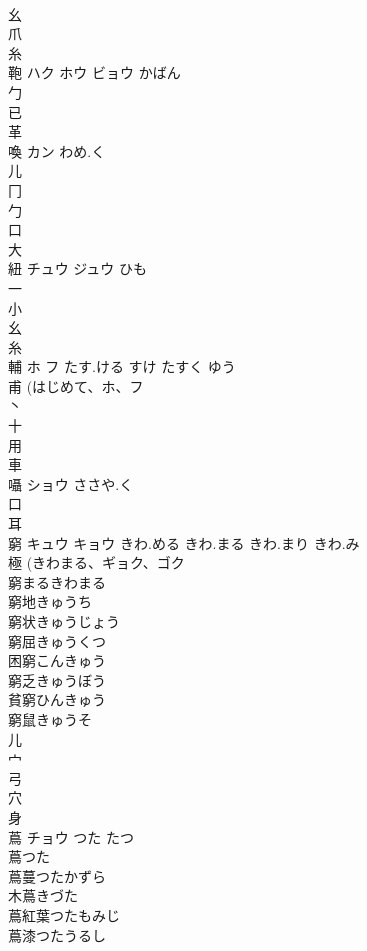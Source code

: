 \documentclass[8pt]{extreport}
\begin{document}
\begin{CJK}{UTF8}{min}
\\	幺 
\\	爪 
\\	糸 
\\	鞄	ハク ホウ ビョウ	かばん	
\\	勹 
\\	已 
\\	革 
\\	喚	カン	わめ.く	
\\	儿 
\\	冂 
\\	勹 
\\	口 
\\	大 
\\	紐	チュウ ジュウ	ひも	
\\	一 
\\	小 
\\	幺 
\\	糸 
\\	輔	ホ フ	たす.ける すけ たすく ゆう	
\\	甫 (はじめて、ホ、フ 
\\	丶 
\\	十 
\\	用 
\\	車 
\\	囁	ショウ	ささや.く	
\\	口 
\\	耳 
\\	窮	キュウ キョウ	きわ.める きわ.まる きわ.まり きわ.み	
\\	極 (きわまる、ギョク、ゴク 
\\	窮まるきわまる
\\	窮地きゅうち
\\	窮状きゅうじょう
\\	窮屈きゅうくつ
\\	困窮こんきゅう
\\	窮乏きゅうぼう
\\	貧窮ひんきゅう
\\	窮鼠きゅうそ
\\	儿 
\\	宀 
\\	弓 
\\	穴 
\\	身 
\\	蔦	チョウ	つた たつ	
\\	蔦つた 
\\	蔦蔓つたかずら 
\\	木蔦きづた 
\\	蔦紅葉つたもみじ 
\\	蔦漆つたうるし 

\end{CJK}
\end{document}
